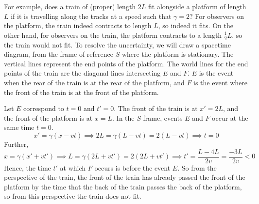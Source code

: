For example, does a train of (proper) length \(2L\) fit alongside a platform of length \(L\) if it is travelling along the tracks at a speed such that \(\gamma = 2\)?
For observers on the platform, the train indeed contracts to length \(L\), so indeed it fits.
On the other hand, for observers on the train, the platform contracts to a length \(\frac{1}{2}L\), so the train would not fit.
To resolve the uncertainty, we will draw a spacetime diagram, from the frame of reference \(S\) where the platform is stationary.
The vertical lines represent the end points of the platform.
The world lines for the end points of the train are the diagonal lines intersecting \( E \) and \( F \).
\(E\) is the event when the rear of the train is at the rear of the platform, and \(F\) is the event where the front of the train is at the front of the platform.
\begin{center}
\end{center}
Let \(E\) correspond to \(t = 0\) and \(t' = 0\).
The front of the train is at \(x' = 2L\), and the front of the platform is at \(x = L\).
In the \(S\) frame, events \(E\) and \(F\) occur at the same time \(t = 0\).
\[
	x' = \gamma(x - vt) \implies 2L = \gamma(L - vt) = 2(L - vt) \implies t = 0
\]
Further,
\[
	x = \gamma(x' + vt') \implies L = \gamma(2L + vt') = 2(2L + vt') \implies t' = \frac{L - 4 L}{2v} = \frac{-3L}{2v} < 0
\]
Hence, the time \(t'\) at which \(F\) occurs is before the event \(E\).
So from the perspective of the train, the front of the train has already passed the front of the platform by the time that the back of the train passes the back of the platform, so from this perspective the train does not fit.

